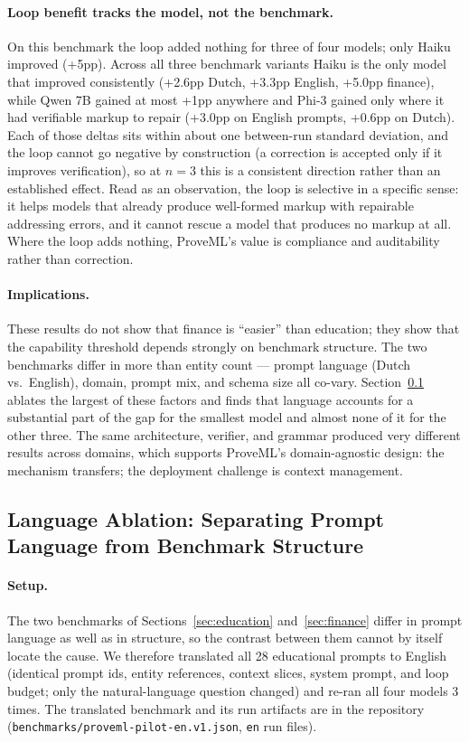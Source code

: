 \documentclass[11pt,a4paper]{article}
\begin{document}
\paragraph{Loop benefit tracks the model, not the benchmark.} On this benchmark the loop added nothing for three of four models; only Haiku improved (+5pp). Across all three benchmark variants Haiku is the only model that improved consistently (+2.6pp Dutch, +3.3pp English, +5.0pp finance), while Qwen 7B gained at most +1pp anywhere and Phi-3 gained only where it had verifiable markup to repair (+3.0pp on English prompts, +0.6pp on Dutch). Each of those deltas sits within about one between-run standard deviation, and the loop cannot go negative by construction (a correction is accepted only if it improves verification), so at $n{=}3$ this is a consistent direction rather than an established effect. Read as an observation, the loop is selective in a specific sense: it helps models that already produce well-formed markup with repairable addressing errors, and it cannot rescue a model that produces no markup at all. Where the loop adds nothing, ProveML's value is compliance and auditability rather than correction.

\paragraph{Implications.} These results do not show that finance is ``easier'' than education; they show that the capability threshold depends strongly on benchmark structure. The two benchmarks differ in more than entity count --- prompt language (Dutch vs.\ English), domain, prompt mix, and schema size all co-vary. Section~\ref{sec:langablation} ablates the largest of these factors and finds that language accounts for a substantial part of the gap for the smallest model and almost none of it for the other three. The same architecture, verifier, and grammar produced very different results across domains, which supports ProveML's domain-agnostic design: the mechanism transfers; the deployment challenge is context management.

\subsection{Language Ablation: Separating Prompt Language from Benchmark Structure}
\label{sec:langablation}

\paragraph{Setup.} The two benchmarks of Sections~\ref{sec:education} and~\ref{sec:finance} differ in prompt language as well as in structure, so the contrast between them cannot by itself locate the cause. We therefore translated all 28 educational prompts to English (identical prompt ids, entity references, context slices, system prompt, and loop budget; only the natural-language question changed) and re-ran all four models 3 times. The translated benchmark and its run artifacts are in the repository (\texttt{benchmarks/proveml-pilot-en.v1.json}, \texttt{en} run files).
\end{document}
